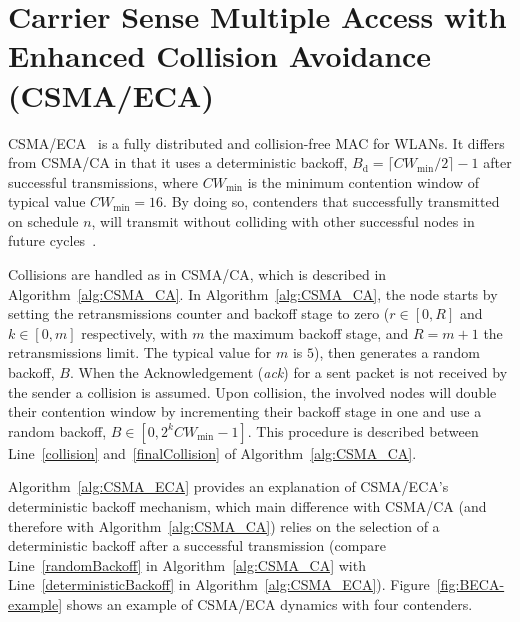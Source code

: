\section{Carrier Sense Multiple Access with Enhanced Collision Avoidance (CSMA/ECA)}\label{introProtocol}

CSMA/ECA~\cite{barcelo2008lba} is a fully distributed and collision-free MAC for WLANs. It differs from CSMA/CA in that it uses a deterministic backoff, $B_{\text{d}}=\lceil CW_{\min}/2\rceil-1$ after successful transmissions, where $CW_{\min}$ is the minimum contention window of typical value $CW_{\min}=16$. By doing so, contenders that successfully transmitted on schedule $n$, will transmit without colliding with other successful nodes in future cycles~\cite{HE}.

Collisions are handled as in CSMA/CA, which is described in Algorithm~\ref{alg:CSMA_CA}. In Algorithm~\ref{alg:CSMA_CA}, the node starts by setting the retransmissions counter and backoff stage to zero ($r\in[0,R]$ and $k\in[0,m]$ respectively, with $m$ the maximum backoff stage, and $R=m+1$ the retransmissions limit. The typical value for $m$ is $5$), then generates a random backoff, $B$. When the Acknowledgement (\emph{ack}) for a sent packet is not received by the sender a collision is assumed. Upon collision, the involved nodes will double their contention window by incrementing their backoff stage in one and use a random backoff, $B\in[0,2^{k}CW_{\min}-1]$. This procedure is described between Line~\ref{collision} and~\ref{finalCollision} of Algorithm~\ref{alg:CSMA_CA}.

Algorithm~\ref{alg:CSMA_ECA} provides an explanation of CSMA/ECA's deterministic backoff mechanism, which main difference with CSMA/CA (and therefore with Algorithm~\ref{alg:CSMA_CA}) relies on the selection of a deterministic backoff after a successful transmission (compare Line~\ref{randomBackoff} in Algorithm~\ref{alg:CSMA_CA} with Line~\ref{deterministicBackoff} in Algorithm~\ref{alg:CSMA_ECA}). Figure~\ref{fig:BECA-example} shows an example of CSMA/ECA dynamics with four contenders.

